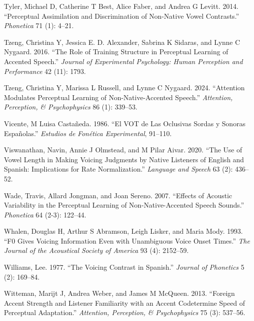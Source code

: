 \documentclass[
  preprint]{elsarticle}
\newlength{\cslhangindent}
\newlength{\cslentryspacingunit} %
\newenvironment{CSLReferences}[2] %
 {%
  \setlength{\parindent}{0pt}
  \ifodd #1
  \let\oldpar\par
  \def\par{\hangindent=\cslhangindent\oldpar}
  \fi
  \setlength{\parskip}{#2\cslentryspacingunit}
 }%
 {}
\begin{document}
\begin{CSLReferences}{1}{0}
\leavevmode{}%
Tyler, Michael D, Catherine T Best, Alice Faber, and Andrea G Levitt. 2014. {``Perceptual Assimilation and Discrimination of Non-Native Vowel Contrasts.''} \emph{Phonetica} 71 (1): 4--21.

\leavevmode{}%
Tzeng, Christina Y, Jessica E. D. Alexander, Sabrina K Sidaras, and Lynne C Nygaard. 2016. {``The Role of Training Structure in Perceptual Learning of Accented Speech.''} \emph{Journal of Experimental Psychology: Human Perception and Performance} 42 (11): 1793.

\leavevmode{}%
Tzeng, Christina Y, Marissa L Russell, and Lynne C Nygaard. 2024. {``Attention Modulates Perceptual Learning of Non-Native-Accented Speech.''} \emph{Attention, Perception, \& Psychophysics} 86 (1): 339--53.

\leavevmode{}%
Vicente, M Luisa Castañeda. 1986. {``El {VOT} de Las Oclusivas Sordas y Sonoras Espa{ñ}olas.''} \emph{Estudios de Fon{é}tica Experimental}, 91--110.

\leavevmode{}%
Viswanathan, Navin, Annie J Olmstead, and M Pilar Aivar. 2020. {``The Use of Vowel Length in Making Voicing Judgments by Native Listeners of {English and Spanish}: Implications for Rate Normalization.''} \emph{Language and Speech} 63 (2): 436--52.

\leavevmode{}%
Wade, Travis, Allard Jongman, and Joan Sereno. 2007. {``Effects of Acoustic Variability in the Perceptual Learning of Non-Native-Accented Speech Sounds.''} \emph{Phonetica} 64 (2-3): 122--44.

\leavevmode{}%
Whalen, Douglas H, Arthur S Abramson, Leigh Lisker, and Maria Mody. 1993. {``F0 Gives Voicing Information Even with Unambiguous Voice Onset Times.''} \emph{The Journal of the Acoustical Society of America} 93 (4): 2152--59.

\leavevmode{}%
Williams, Lee. 1977. {``The Voicing Contrast in {Spanish}.''} \emph{Journal of Phonetics} 5 (2): 169--84.

\leavevmode{}%
Witteman, Marijt J, Andrea Weber, and James M McQueen. 2013. {``Foreign Accent Strength and Listener Familiarity with an Accent Codetermine Speed of Perceptual Adaptation.''} \emph{Attention, Perception, \& Psychophysics} 75 (3): 537--56.


\end{CSLReferences}
\end{document}
